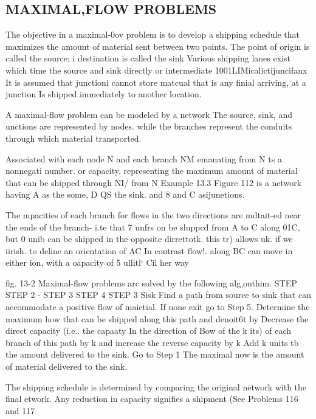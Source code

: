 \documentclass[11pt]{article} %
\begin{document}
\subsection{MAXIMAL,FLOW PROBLEMS} The objective in a maximal-0ov problem is to develop a shipping schedule that maximizes the amount of material sent between two points. The point of origin is called the source; i destination is called the sink Various shipping lanes exist which time the source and sink directly or intermediate 1001LIMicalictijuncifanx It is assumed that junctioni cannot store matcual that is any finial arriving, at a junction Is shipped immediately to another location. 

A maximal-flow problem can be modeled by a network The source, sink, and unctions are represented by nodes. while the branches represent the conduits through which material transported. 

Associated with each node N and each branch NM emanating from N ts a nonnegati number. or capacity. representing the maximum amount of material that can be shipped through NI/ from N Example 13.3 Figure 112 is a network having A as the some, D QS the sink. and 8 and C asijunetions. 

The mpacities of each branch for flows in the two directions are mdtait-ed near the ends of the branch- i.te that 7 unfrs on be sluppcd from A to C along 01C, but 0 unib can be shipped in the opposite dirrettotk. this tr) allows uk. if we iirish. to deline an orientation of AC In contrast flow!. along BC can move in either ion, with a oapacity of 5 ullitl‘ Cil her way 

fig. 13-2 
Maximal-flow problems arc solved by the following alg,onthim. 
STEP 
STEP 2 - STEP 3 
STEP 4 STEP 3 
Sisk 
Find a path from source to sink that can accommodate a positive flow of maictial. If none exit go to Step 5. Determine the maximum how that can be shipped along this path and denoit6t by Decrease the direct capacity (i.e.. the capaaty In the direction of Bow of the k its) of each branch of this path by k and increase the reverse capacity by k Add k units tb the amount delivered to the sink. Go to Step 1 The maximal now is the amount of material delivered to the sink. 

The shipping schedule is determined by comparing the original network with the final etwork. Any reduction in capacity signifies a shipment 
(See Problems 116 and 117 
\end{document}
